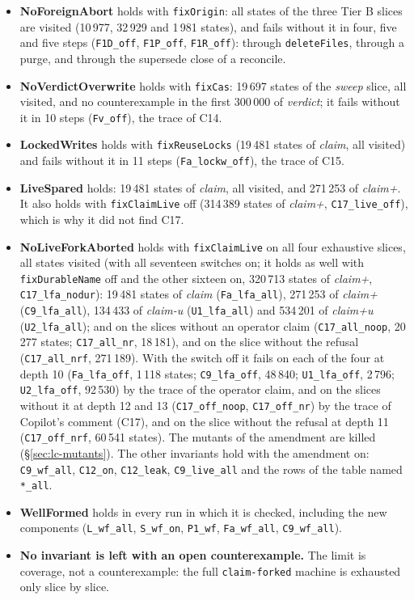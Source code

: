 \documentclass[a4paper,10pt,fleqn]{article}
\newcommand{\field}[1]{\texttt{#1}}
\begin{document}
\begin{itemize}
  \item \textbf{NoForeignAbort} holds with \field{fixOrigin}: all states of
    the three Tier B slices are visited (10\,977, 32\,929 and 1\,981 states),
    and fails without it in four, five and five steps (\texttt{F1D\_off},
    \texttt{F1P\_off}, \texttt{F1R\_off}): through \field{deleteFiles}, through a
    purge, and through the supersede close of a reconcile.
  \item \textbf{NoVerdictOverwrite} holds with \field{fixCas}: 19\,697 states of
    the \emph{sweep} slice, all visited, and no counterexample in the first
    300\,000 of \emph{verdict}; it fails without it in 10 steps
    (\texttt{Fv\_off}), the trace of C14.
  \item \textbf{LockedWrites} holds with \field{fixReuseLocks} (19\,481 states
    of \emph{claim}, all visited) and fails without it in 11 steps
    (\texttt{Fa\_lockw\_off}), the trace of C15.
  \item \textbf{LiveSpared} holds: 19\,481 states of \emph{claim}, all visited,
    and 271\,253 of \emph{claim+}. It also holds with \field{fixClaimLive}
    off (314\,389 states of \emph{claim+}, \texttt{C17\_live\_off}), which is
    why it did not find C17.
  \item \textbf{NoLiveForkAborted} holds with \field{fixClaimLive} on all four
    exhaustive slices, all states visited (with all seventeen switches on; it
    holds as well with \field{fixDurableName} off and the other sixteen on,
    320\,713 states of \emph{claim+}, \texttt{C17\_lfa\_nodur}):
    19\,481 states of \emph{claim} (\texttt{Fa\_lfa\_all}), 271\,253 of
    \emph{claim+} (\texttt{C9\_lfa\_all}), 134\,433 of \emph{claim-u}
    (\texttt{U1\_lfa\_all}) and 534\,201 of \emph{claim+u}
    (\texttt{U2\_lfa\_all}); and on the slices without an operator claim
    (\texttt{C17\_all\_noop}, 20\,277 states; \texttt{C17\_all\_nr}, 18\,181), and
    on the slice without the refusal (\texttt{C17\_all\_nrf}, 271\,189).
    With the switch off it fails on each of the four at depth 10
    (\texttt{Fa\_lfa\_off}, 1\,118 states; \texttt{C9\_lfa\_off}, 48\,840;
    \texttt{U1\_lfa\_off}, 2\,796; \texttt{U2\_lfa\_off}, 92\,530) by the trace of the
    operator claim, and on the slices without it at depth 12 and 13
    (\texttt{C17\_off\_noop}, \texttt{C17\_off\_nr}) by the trace of Copilot's
    comment (C17), and on the slice without the refusal at depth 11
    (\texttt{C17\_off\_nrf}, 60\,541 states). The mutants of the amendment are killed
    (\S\ref{sec:lc-mutants}). The other invariants hold with the amendment on:
    \texttt{C9\_wf\_all}, \texttt{C12\_on}, \texttt{C12\_leak},
    \texttt{C9\_live\_all} and the rows of the table named \texttt{*\_all}.
  \item \textbf{WellFormed} holds in every run in which it is checked,
    including the new components (\texttt{L\_wf\_all}, \texttt{S\_wf\_on},
    \texttt{P1\_wf}, \texttt{Fa\_wf\_all}, \texttt{C9\_wf\_all}).
  \item \textbf{No invariant is left with an open counterexample.} The limit
    is coverage, not a counterexample: the full
    \field{claim-forked} machine is exhausted only slice by slice.
\end{itemize}
\end{document}

